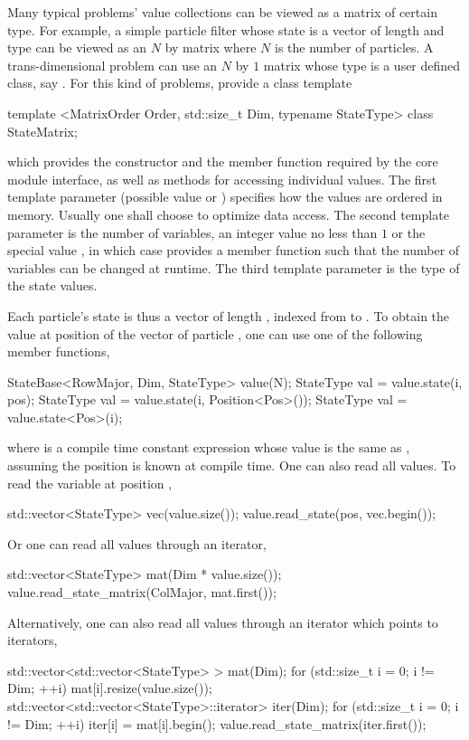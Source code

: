 Many typical problems' value collections can be viewed as a matrix of certain
type. For example, a simple particle filter whose state is a vector of length
 and type  can be viewed as an $N$ by  matrix
where $N$ is the number of particles. A trans-dimensional problem can use an
$N$ by $1$ matrix whose type is a user defined class, say .
For this kind of problems, \vsmc provide a class template
\begin{cppcode}
template <MatrixOrder Order, std::size_t Dim, typename StateType>
class StateMatrix;
\end{cppcode}
which provides the constructor and the  member function required by
the core module interface, as well as methods for accessing individual values.
The first template parameter (possible value  or
) specifies how the values are ordered in memory. Usually one
shall choose  to optimize data access. The second template
parameter is the number of variables, an integer value no less than $1$ or the
special value , in which case  provides a
member function  such that the number of variables can be
changed at runtime. The third template parameter is the type of the state
values.

Each particle's state is thus a vector of length , indexed from
 to . To obtain the value at position  of the
vector of particle , one can use one of the following member
functions,
\begin{cppcode}
StateBase<RowMajor, Dim, StateType> value(N);
StateType val = value.state(i, pos);
StateType val = value.state(i, Position<Pos>());
StateType val = value.state<Pos>(i);
\end{cppcode}
where  is a compile time constant expression whose value is the same
as , assuming the position is known at compile time. One can also
read all values. To read the variable at position ,
\begin{cppcode}
std::vector<StateType> vec(value.size());
value.read_state(pos, vec.begin());
\end{cppcode}
Or one can read all values through an iterator,
\begin{cppcode}
std::vector<StateType> mat(Dim * value.size());
value.read_state_matrix(ColMajor, mat.first());
\end{cppcode}
Alternatively, one can also read all values through an iterator which points
to iterators,
\begin{cppcode}
std::vector<std::vector<StateType> > mat(Dim);
for (std::size_t i = 0; i != Dim; ++i)
    mat[i].resize(value.size());
std::vector<std::vector<StateType>::iterator> iter(Dim);
for (std::size_t i = 0; i != Dim; ++i)
    iter[i] = mat[i].begin();
value.read_state_matrix(iter.first());
\end{cppcode}

